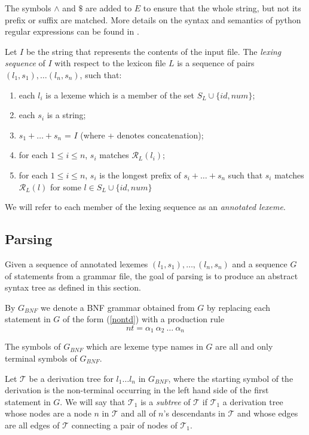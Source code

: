 \documentclass[a4paper,10pt]{article}
\def\st{\noindent}
\begin{document}
The symbols $\wedge$ and $\$$ are added to $E$ to ensure that the whole string, but not its prefix or suffix are matched. More details on  the syntax and semantics of python regular expressions can be found in \cite{pythonre}.

Let $I$ be the string that represents the contents of the input file. 
The \textit{lexing sequence} of $I$ with respect to the lexicon file $L$ is a sequence of pairs $(l_1,s_1),\ldots (l_n,s_n)$, such that:

\begin{enumerate}
\item each $l_i$ is a lexeme which is a member of the set $S_L \cup \{id,num\}$;
\item each $s_i$ is a string;
\item $s_1+\ldots+s_n$ = $I$ (where + denotes concatenation);
\item for each $1 \le i  \le n$, $s_i$ matches $\mathcal{R}_L(l_i)$;
\item for each $1 \le i \le n$, $s_i$ is the longest prefix of $s_i+\ldots+s_n$ such that $s_i$ matches  $\mathcal{R}_L(l)$ for some  $l \in  S_L \cup \{id,num\}$ 
\end{enumerate}


We will refer to each member of the lexing sequence as an \textit{annotated lexeme}.






\subsection{Parsing}\label{pars}
Given a sequence of annotated lexemes  $(l_1,s_1),\ldots, (l_n,s_n)$ and a sequence $G$ of statements  from a grammar file, the goal of parsing is to produce an abstract syntax tree  as defined in this section. 

By $G_{BNF}$ we denote a BNF grammar obtained from $G$ by 
replacing each statement in $G$ of the form
(\ref{nontd}) with a production rule
\begin{equation*}\label{grule}
nt = \alpha_1~\alpha_2~\ldots~\alpha_n 
\end{equation*}

\st
The symbols of $G_{BNF}$ which are lexeme type names in $G$ are all and only terminal symbols of $G_{BNF}$.

\st Let $\mathcal{T}$ be  a  derivation tree for $l_1\ldots l_n$ in $G_{BNF}$,  where  the starting symbol of the derivation  is the non-terminal occurring in the left hand side of the first statement in $G$. We will say that $\mathcal{T}_1$ is a \textit{subtree} of $\mathcal{T}$ if $\mathcal{T}_1$  a derivation tree whose nodes are a node $n$ in $\mathcal{T}$ and  all of $n$'s descendants in $\mathcal{T}$ and whose edges are all edges of $\mathcal{T}$ connecting a pair of nodes of $\mathcal{T}_1$. 
\end{document}

